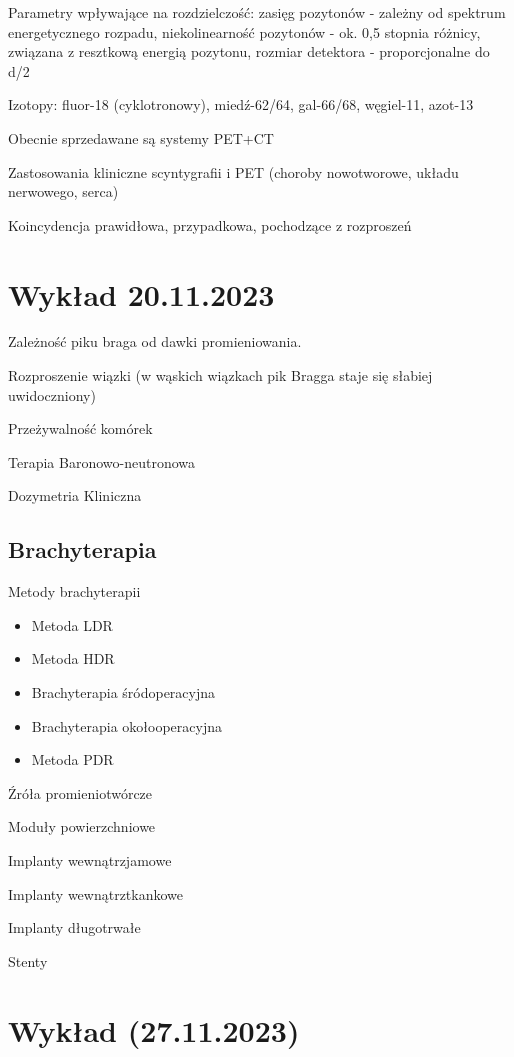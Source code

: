 \documentclass{article}
\begin{document}
Parametry wpływające na rozdzielczość: zasięg pozytonów - zależny od spektrum energetycznego rozpadu, niekolinearność pozytonów - ok. 0,5 stopnia różnicy, związana z resztkową energią pozytonu, rozmiar detektora - proporcjonalne do d/2

Izotopy: fluor-18 (cyklotronowy), miedź-62/64, gal-66/68, węgiel-11, azot-13

Obecnie sprzedawane są systemy PET+CT

Zastosowania kliniczne scyntygrafii i PET (choroby nowotworowe, układu nerwowego, serca)

Koincydencja prawidłowa, przypadkowa, pochodzące z rozproszeń


\section{Wykład 20.11.2023}

Zależność piku braga od dawki promieniowania.

Rozproszenie wiązki (w wąskich wiązkach pik Bragga staje się słabiej uwidoczniony)

Przeżywalność komórek

Terapia Baronowo-neutronowa

Dozymetria Kliniczna

\subsection{Brachyterapia}

Metody brachyterapii
\begin{itemize}
    \item Metoda LDR
    \item Metoda HDR
    \item Brachyterapia śródoperacyjna
    \item Brachyterapia okołooperacyjna
    \item Metoda PDR
\end{itemize}

Źróła promieniotwórcze

Moduły powierzchniowe

Implanty wewnątrzjamowe

Implanty wewnątrztkankowe

Implanty długotrwałe

Stenty

\section{Wykład (27.11.2023)}
\end{document}
